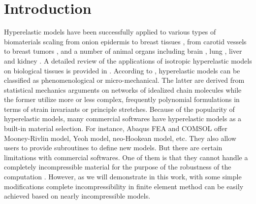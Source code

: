 \section{Introduction}
Hyperelastic models have been successfully applied to various types of biomaterials scaling from onion epidermis \cite{Qian} to breast tissues \cite{OHagen}, from carotid vessels \cite{Zidi, Zidi2, Bols} to breast tumors \cite{Oberai}, and a number of animal organs including brain \cite{Karimi, Samani, Gilchrist}, lung  \cite{Wall, Wall2}, liver and kidney \cite{Fu, Untaroiu, Willinger}. A detailed review of the applications of isotropic hyperelastic models on biological tissues is provided in \cite{Kupriyanova}.
According to \cite{Steinmann}, hyperelastic models can be classified as phenomenological or micro-mechanical. The latter are derived from statistical mechanics arguments on networks of idealized chain molecules while the former utilize more or less complex, frequently polynomial formulations in terms of strain invariants or principle stretches. Because of the popularity of hyperelastic models, many commercial softwares have hyperelastic models as a built-in material selection. For instance, Abaqus FEA and COMSOL offer Mooney-Rivlin model, Yeoh model, neo-Hookean model, etc. They also allow users to provide subroutines to define new models. But there are certain limitations with commercial softwares. One of them is that they cannot handle a completely incompressible material for the purpose of the robustness of the computation \cite{Abaqus}. However, as we will demonstrate in this work, with some simple modifications complete incompressibility in finite element method can be easily achieved based on nearly incompressible models.

